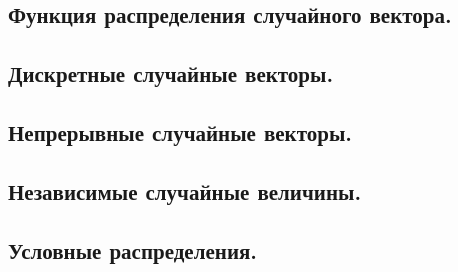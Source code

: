 
\subsection{Функция распределения случайного вектора.}



\newpage
\subsection{Дискретные случайные векторы.}



\newpage
\subsection{Непрерывные случайные векторы.}



\newpage
\subsection{Независимые случайные величины.}



\newpage
\subsection{Условные распределения.}
